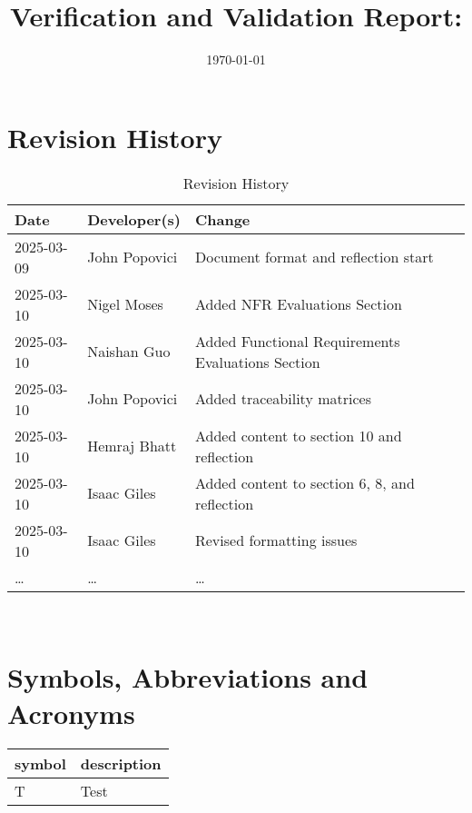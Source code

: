 \documentclass[12pt, titlepage]{article}
\begin{document}
\title{Verification and Validation Report: \progname} 
\author{\authname}
\date{\today}
	
\maketitle


\section{Revision History}

\begin{table}[hp]
\caption{Revision History} \label{TblRevisionHistory}
\begin{tabularx}{\textwidth}{llX}
\toprule
\textbf{Date} & \textbf{Developer(s)} & \textbf{Change}\\
\midrule
2025-03-09 & John Popovici & Document format and reflection start\\
2025-03-10 & Nigel Moses & Added NFR Evaluations Section\\
2025-03-10 & Naishan Guo & Added Functional Requirements Evaluations Section\\
2025-03-10 & John Popovici & Added traceability matrices\\
2025-03-10 & Hemraj Bhatt & Added content to section 10 and reflection\\
2025-03-10 & Isaac Giles & Added content to section 6, 8, and reflection\\
2025-03-10 & Isaac Giles & Revised formatting issues\\
\dots & \dots & \dots \\
\bottomrule
\end{tabularx}
\end{table}

~\newpage

\section{Symbols, Abbreviations and Acronyms}

\renewcommand{\arraystretch}{1.2}
\begin{tabular}{l l} 
  \toprule		
  \textbf{symbol} & \textbf{description}\\
  \midrule 
  T & Test\\
  \bottomrule
\end{tabular}\\
\end{document}
